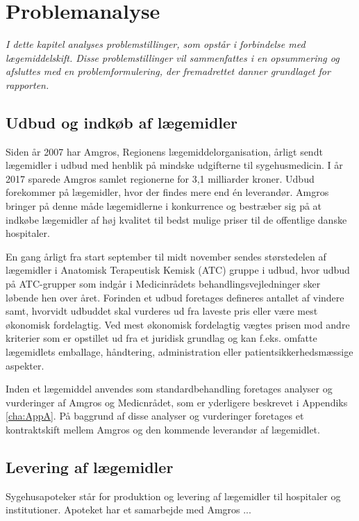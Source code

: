\chapter{Problemanalyse}
\textit{I dette kapitel analyses problemstillinger, som opstår i forbindelse med lægemiddelskift. Disse problemstillinger vil sammenfattes i en opsummering og afsluttes med en problemformulering, der fremadrettet danner  grundlaget for rapporten.}

\section{Udbud og indkøb af lægemidler}
Siden år 2007 har Amgros, Regionens lægemiddelorganisation, årligt sendt lægemidler i udbud med henblik på mindske udgifterne til sygehusmedicin. I år 2017 sparede Amgros samlet regionerne for 3,1 milliarder kroner. Udbud forekommer på lægemidler, hvor der findes mere end én leverandør. Amgros bringer på denne måde lægemidlerne i konkurrence og bestræber sig på at indkøbe lægemidler af høj kvalitet til bedst mulige priser til de offentlige danske hospitaler.

En gang årligt fra start september til midt november sendes størstedelen af lægemidler i Anatomisk Terapeutisk Kemisk (ATC) gruppe i udbud, hvor udbud på ATC-grupper som indgår i Medicinrådets behandlingsvejledninger sker løbende hen over året. Forinden et udbud foretages defineres antallet af vindere samt, hvorvidt udbuddet skal vurderes ud fra laveste pris eller være mest økonomisk fordelagtig. Ved mest økonomisk fordelagtig vægtes prisen mod andre kriterier som er opstillet ud fra et juridisk grundlag og kan f.eks. omfatte lægemidlets emballage, håndtering, administration eller patientsikkerhedsmæssige aspekter.

Inden et lægemiddel anvendes som standardbehandling foretages analyser og vurderinger af Amgros og Medicnrådet, som er yderligere beskrevet i Appendiks \ref{cha:AppA}. På baggrund af disse analyser og vurderinger foretages et kontraktskift mellem Amgros og den kommende leverandør af lægemidlet.

\section{Levering af lægemidler}
Sygehusapoteker står for produktion og levering af lægemidler til hospitaler og institutioner. Apoteket har et samarbejde med Amgros ...

